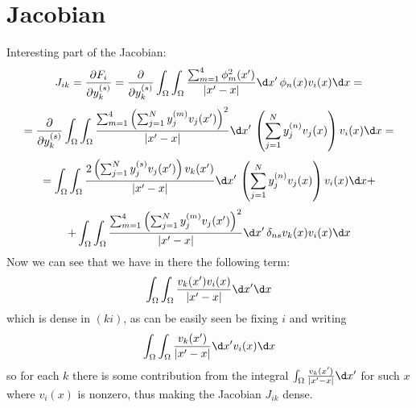 \documentclass[11pt]{article}
\begin{document}
\section{Jacobian}

Interesting part of the Jacobian:
$$J_{ik} = {\partial F_i\over\partial y_k^{(s)}} =
{\partial\over\partial y_k^{(s)}}\int_\Omega \int_\Omega {
\sum_{m=1}^4 \phi_m^2(x')
\over|x' - x|}\d x'\,\phi_n(x) v_i(x) \d x =
$$
$$
=
{\partial\over\partial y_k^{(s)}}\int_\Omega \int_\Omega {
\sum_{m=1}^4 \left(\sum_{j=1}^N y_j^{(m)} v_j(x')\right)^2
\over|x' - x|}\d x'\, \left(\sum_{j=1}^N y_j^{(n)} v_j(x)\right)  v_i(x) \d x =
$$
$$
=
\int_\Omega \int_\Omega {
2 \left(\sum_{j=1}^N y_j^{(s)} v_j(x')\right)v_k(x')
\over|x' - x|}\d x'\, \left(\sum_{j=1}^N y_j^{(n)} v_j(x)\right)  v_i(x) \d x +
$$
$$+
\int_\Omega \int_\Omega {
\sum_{m=1}^4 \left(\sum_{j=1}^N y_j^{(m)} v_j(x')\right)^2
\over|x' - x|}\d x'\, \delta_{ns}v_k(x)  v_i(x) \d x
$$
Now we can see that we have in there the following term:
$$
\int_\Omega \int_\Omega {v_k(x') v_i(x)\over |x'-x|}\d x'\d x
$$
which is dense in $(ki)$, as can be easily seen be fixing $i$ and writing
$$
\int_\Omega \int_\Omega {v_k(x')\over |x'-x|}\d x' v_i(x)\d x
$$
so for each $k$ there is some contribution from the integral $ \int_\Omega
{v_k(x')\over |x'-x|}\d x' $ for such $x$ where $v_i(x)$ is nonzero, thus
making the Jacobian $J_{ik}$ dense.
\end{document}
